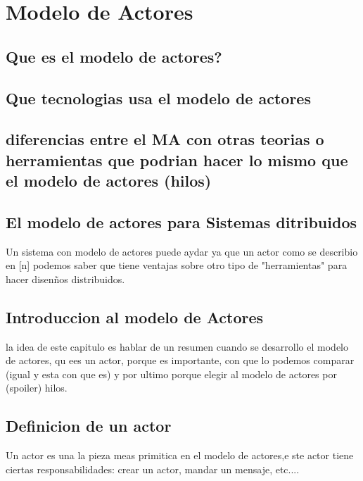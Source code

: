 
\chapter{Modelo de Actores} %
\label{Chapter2}

\section{Que es el modelo de actores?}
\section{Que tecnologias usa el modelo de actores}
\section{diferencias entre el MA con otras teorias o herramientas
  que podrian hacer lo mismo que el modelo de actores (hilos) }
\section{El modelo de actores para Sistemas ditribuidos }

Un sistema con modelo de actores puede aydar ya que un actor como se describio en [n]
podemos saber que tiene ventajas sobre otro tipo de "herramientas" para hacer
disen\~nos distribuidos.


\section{Introduccion al modelo de Actores}

la idea de este capitulo es hablar de un resumen cuando se desarrollo el modelo de actores, qu ees un actor, porque es importante,  con que lo podemos comparar (igual y esta con que es) y por ultimo porque elegir al modelo de actores por (spoiler) hilos.

\section{Definicion de un actor}
Un actor es una la pieza meas primitica en el modelo de actores,e ste actor tiene ciertas responsabilidades: crear un actor, mandar un mensaje, etc....
